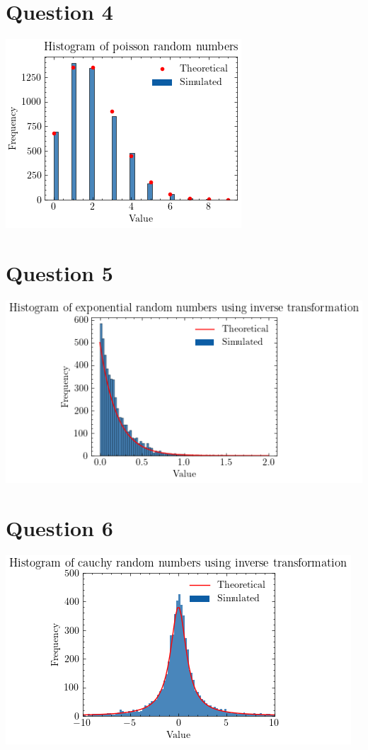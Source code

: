 \documentclass{article}
\begin{document}
\section*{Question 4}
\includegraphics[scale=0.7]{imgs/poissonrv.png}  \\

\section*{Question 5}
\includegraphics[scale=0.7]{imgs/exprv.png}  \\

\section*{Question 6}
\includegraphics[scale=0.7]{imgs/cauchyrv.png}  \\
\end{document}
